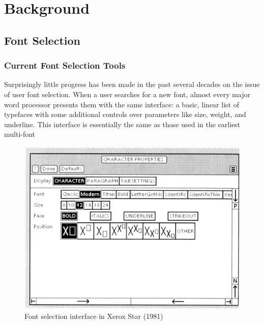 \chapter{Background}
\label{chap:background}

\section{Font Selection}

\subsection{Current Font Selection Tools}

\begingroup
\parfillskip=0pt

Surprisingly little progress has been made in the past several decades on the issue of user font selection. When a user searches for a new font, almost every major word processor presents them with the same interface: a basic, linear list of typefaces with some additional controls over parameters like size, weight, and underline. This interface is essentially the same as those used in the earliest multi-font

\par
\endgroup

\begin{figure}[H]
    \centering
    \includegraphics[width=.8\textwidth]{images/xerox-star.png}
    \caption{Font selection interface in Xerox Star (1981)}
    \label{fig:xerox-star}
\end{figure}

